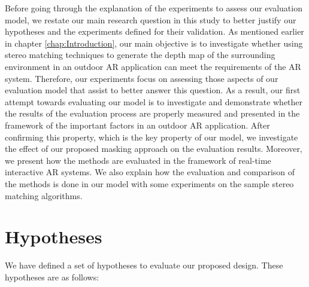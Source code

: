 Before going through the explanation of the experiments to assess our evaluation model, we restate our main research question in this
study to better justify our hypotheses and the experiments defined for their validation. 
As mentioned earlier in chapter \ref{chap:Introduction}, our main objective is to investigate whether using 
stereo matching techniques to generate the depth map of the 
surrounding environment in an outdoor AR application can meet the requirements of the AR system. 
Therefore, our experiments focus 
on assessing those aspects of our evaluation model that assist to better answer this question.
As a result, our first attempt towards evaluating our model is to investigate and demonstrate whether the results of the evaluation process 
are properly measured and presented in the framework of the important factors in an outdoor AR application.
After confirming this property, which is the key property of our model, we investigate the effect of our proposed masking 
approach on the evaluation results. Moreover, we present how the methods are evaluated in the framework of 
real-time interactive AR systems.
We also explain how the evaluation and comparison of the methods is done in our model with some
experiments on the sample stereo matching algorithms.

\section{Hypotheses}

We have defined a set of hypotheses to evaluate our proposed design. These hypotheses are as follows:

